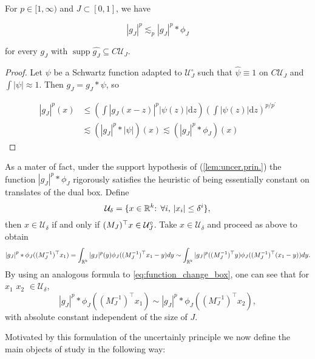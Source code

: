 \begin{lem}\label{lem:uncer.prin.}
    For $p \in[1, \infty)$ and $J \subset[0,1]$, we have

$$
\left|g_{J}\right|^{p} \lesssim_{p}\left|g_{J}\right|^{p} * \phi_{J}
$$

for every $g_{J}$ with $\operatorname{supp} \widehat{g_{J}} \subseteq C \mathcal{U}_{J}$.

\end{lem}
\begin{proof}
Let $\psi$ be a Schwartz function adapted to $\mathcal{U}_{J}^{\circ}$ such that $\hat{\psi} \equiv 1$ on $C \mathcal{U}_{J}$ and $\int|\psi| \approx 1$. Then $g_{J}=g_{J} * \psi$, so


\begin{align*}
\left|g_{J}\right|^{p}(x) & \leqslant\left(\int\left|g_{J}(x-z)\right|^{p}|\psi(z)| \mathrm{d} z\right)\left(\int|\psi(z)| \mathrm{d} z\right)^{p / p^{\prime}}\\
& \lesssim\left(\left|g_{J}\right|^{p} *|\psi|\right)(x) \lesssim\left(\left|g_{J}\right|^{p} * \phi_{J}\right)(x)
\end{align*}

\end{proof}
As a mater of fact, under the support hypothesis of (\ref{lem:uncer.prin.}) the function $\left|g_{J}\right|^{p} * \phi_{J}$ rigorously satisfies the heuristic of being essentially constant on translates of the dual box. Define
$$\mathcal{U}_{\delta} =\{x\in \mathbb{R}^k\text{: } \forall i\text{, } |x_i|\leq \delta^{i} \}, $$ then $x\in \mathcal{U}_{\delta}$ if and only if $(M_{J})^{\top}x \in \mathcal{U}^\circ_{J}$.
Take $x \in \mathcal{U}_{\delta}$ and proceed as above to obtain 
$$\left|g_{J}\right|^{p} * \phi_{J}((M_{J}^{-1})^{\top}x_{1}) = \int_{\mathbb{R}^k} |g_{J}|^{p}(y)\phi_{J}((M_{J}^{-1})^{\top}x_{1}-y)dy \sim 
\int_{\mathbb{R}^k} |g_{J}|^{p}((M_{J}^{-1})^{\top}y)\phi_{J}((M_{J}^{-1})^{\top}(x_{1}-y))dy. 
$$
By using an analogous formula to \ref{eq:function_change_box}, one can see that for $x_1$ $x_2$ $\in \mathcal{U}_\delta$, $$\left|g_{J}\right|^{p} * \phi_{J}((M_{J}^{-1})^{\top}x_{1}) \sim \left|g_{J}\right|^{p} * \phi_{J}((M_{J}^{-1})^{\top}x_{2}),$$ with absolute constant independent of the size of $J$.

Motivated by this formulation of the uncertainly principle we now define the main objects of study in the following way:

